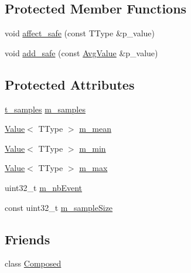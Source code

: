 \subsection*{Protected Member Functions}
\begin{DoxyCompactItemize}
\item 
void \hyperlink{classxtd_1_1counters_1_1AvgValue_a3ad3008fc30f1936e8dd1eef1d62f324}{affect\-\_\-safe} (const T\-Type \&p\-\_\-value)
\item 
void \hyperlink{classxtd_1_1counters_1_1AvgValue_ad0532ed35af8242fabd3a910cc88c543}{add\-\_\-safe} (const \hyperlink{classxtd_1_1counters_1_1AvgValue}{Avg\-Value} \&p\-\_\-value)
\end{DoxyCompactItemize}
\subsection*{Protected Attributes}
\begin{DoxyCompactItemize}
\item 
\hyperlink{classxtd_1_1counters_1_1AvgValue_aa58af8a852f52342b087373414e61878}{t\-\_\-samples} \hyperlink{classxtd_1_1counters_1_1AvgValue_a787afb6a601eb29f48a0fd247524cf84}{m\-\_\-samples}
\item 
\hyperlink{classxtd_1_1counters_1_1Value}{Value}$<$ T\-Type $>$ \hyperlink{classxtd_1_1counters_1_1AvgValue_afa1908ab38d3deef50e1169b1cc20f6c}{m\-\_\-mean}
\item 
\hyperlink{classxtd_1_1counters_1_1Value}{Value}$<$ T\-Type $>$ \hyperlink{classxtd_1_1counters_1_1AvgValue_a8e217891d937894812b5edfcf6a5ce0e}{m\-\_\-min}
\item 
\hyperlink{classxtd_1_1counters_1_1Value}{Value}$<$ T\-Type $>$ \hyperlink{classxtd_1_1counters_1_1AvgValue_a9ee9567a0a95cf6b579c13329f21f0d5}{m\-\_\-max}
\item 
uint32\-\_\-t \hyperlink{classxtd_1_1counters_1_1AvgValue_aba4c4022706bda9bfdedea3cb9c3647a}{m\-\_\-nb\-Event}
\item 
const uint32\-\_\-t \hyperlink{classxtd_1_1counters_1_1AvgValue_a85edafd4829b5aa5be6562cadd8e4764}{m\-\_\-sample\-Size}
\end{DoxyCompactItemize}
\subsection*{Friends}
\begin{DoxyCompactItemize}
\item 
class \hyperlink{classxtd_1_1counters_1_1AvgValue_a93e934ad70d5b32b14beed5572450abf}{Composed}
\end{DoxyCompactItemize}


